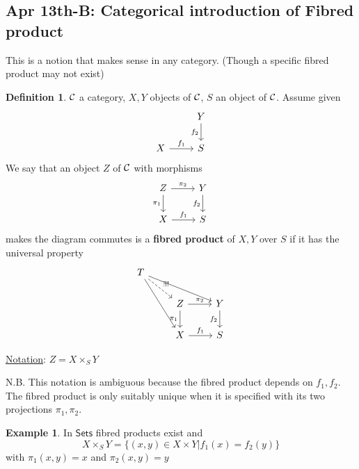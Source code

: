 \documentclass[11pt]{article}
\theoremstyle{definition}
\newtheorem{dfn}[thm]{Definition}
\newtheorem{ex}[thm]{Example}
\newcommand{\calc}{{\cal C}}
\begin{document}
\subsection{Apr 13th-B: Categorical introduction of Fibred product}
This is a notion that makes sense in any category. (Though a specific fibred product may not exist)
\begin{dfn}
$\calc$ a category, $X,Y$ objects of $\calc$, $S$ an object of $\calc$. Assume given
$$
\begin{tikzcd}
 & Y \arrow[d, "f_2"'] \\
X \arrow[r, "f_1"] & S
\end{tikzcd}
$$
We say that an object $Z$ of $\calc$ with morphisms 
$$
\begin{tikzcd}
Z \arrow[r, "\pi_2"] \arrow[d, "\pi_1"'] & Y \arrow[d, "f_2"'] \\
X \arrow[r, "f_1"] & S
\end{tikzcd}
$$
makes the diagram commutes is a \textbf{fibred product} of $X,Y$ over $S$ if it has the universal property
$$
\begin{tikzcd}
T \arrow[rdd] \arrow[rrd] \arrow[rd, "\exists!", dashed] &  &  \\
 & Z \arrow[r, "\pi_2"] \arrow[d, "\pi_1"'] & Y \arrow[d, "f_2"'] \\
 & X \arrow[r, "f_1"] & S
\end{tikzcd}
$$

\underline{Notation}: $Z=X\times_S Y$
\end{dfn}
N.B. This notation is ambiguous because the fibred product depends on $f_1,f_2$. The fibred product is only suitably unique when it is specified with its two projections $\pi_1,\pi_2$.
\begin{ex}
In $\mathsf{Sets}$ fibred products exist and
$$
X\times_S Y=\{(x,y)\in X\times Y|f_1(x)=f_2(y)\}
$$
with $\pi_1(x,y)=x$ and $\pi_2(x,y)=y$
\end{ex}
\end{document}
